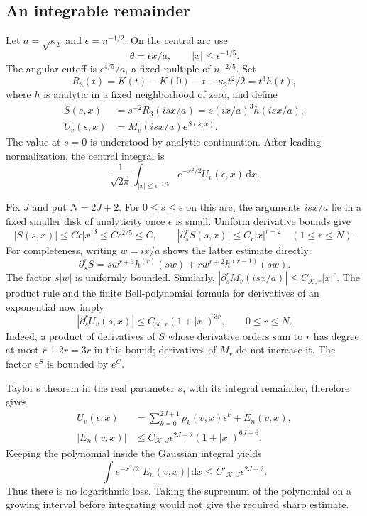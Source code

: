 \documentclass[11pt,letterpaper]{article}
\numberwithin{equation}{section}
\theoremstyle{remark}\newtheorem{remark}[theorem]{Remark}
\newcommand{\dd}{\,\mathrm d}
\begin{document}
\subsection{An integrable remainder}
Let $a=\sqrt{\kappa_2}$ and $\epsilon=n^{-1/2}$. On the central arc use
\[
 \theta=\epsilon x/a,\qquad |x|\leq\epsilon^{-1/5}.
\]
The angular cutoff is $\epsilon^{4/5}/a$, a fixed multiple of $n^{-2/5}$.
Set
\[
 R_3(t)=K(t)-K(0)-t-\kappa_2t^2/2=t^3h(t),
\]
where $h$ is analytic in a fixed neighborhood of zero, and define
\begin{align*}
 S(s,x)&=s^{-2}R_3(isx/a)=s(ix/a)^3h(isx/a),\\
 U_v(s,x)&=M_v(isx/a)e^{S(s,x)}.
\end{align*}
The value at $s=0$ is understood by analytic continuation. After leading
normalization, the central integral is
\begin{equation}\label{lop:eq:central}
 \frac1{\sqrt{2\pi}}
 \int_{|x|\leq\epsilon^{-1/5}}e^{-x^2/2}U_v(\epsilon,x)\dd x.
\end{equation}

Fix $J$ and put $N=2J+2$. For $0\leq s\leq\epsilon$ on this arc,
the arguments $isx/a$ lie in a fixed smaller disk of analyticity once
$\epsilon$ is small. Uniform derivative bounds give
\[
 |S(s,x)|\leq C\epsilon|x|^3\leq C\epsilon^{2/5}\leq C,
 \qquad |\partial_s^r S(s,x)|\leq C_r|x|^{r+2}\quad(1\leq r\leq N).
\]
For completeness, writing $w=ix/a$ shows the latter estimate directly:
\[
 \partial_s^r S=s w^{r+3}h^{(r)}(sw)
                       +r w^{r+2}h^{(r-1)}(sw).
\]
The factor $s|w|$ is uniformly bounded. Similarly,
$|\partial_s^rM_v(isx/a)|\leq C_{\mathcal K,r}|x|^r$.
The product rule and the finite Bell-polynomial formula for derivatives
of an exponential now imply
\begin{equation}\label{lop:eq:uderiv}
 |\partial_s^r U_v(s,x)|\leq C_{\mathcal K,r}(1+|x|)^{3r},
 \qquad 0\leq r\leq N.
\end{equation}
Indeed, a product of derivatives of $S$ whose derivative orders sum to
$r$ has degree at most $r+2r=3r$ in this bound; derivatives of $M_v$
do not increase it. The factor $e^S$ is bounded by $e^C$.

Taylor's theorem in the real parameter $s$, with its integral remainder,
therefore gives
\begin{align}
 U_v(\epsilon,x)&=\sum_{k=0}^{2J+1}p_k(v,x)\epsilon^k+E_n(v,x),
 \label{lop:eq:taylor}\\
 |E_n(v,x)|&\leq C_{\mathcal K,J}\epsilon^{2J+2}(1+|x|)^{6J+6}.
 \label{lop:eq:remainder}
\end{align}
Keeping the polynomial inside the Gaussian integral yields
\[
 \int e^{-x^2/2}|E_n(v,x)|\dd x
 \leq C'_{\mathcal K,J}\epsilon^{2J+2}.
\]
Thus there is no logarithmic loss. Taking the supremum of the polynomial
on a growing interval before integrating would not give the required
sharp estimate.
\end{document}
